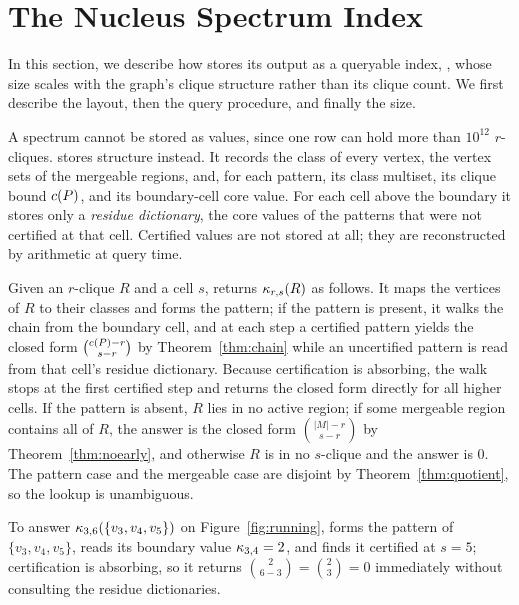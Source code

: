 \section{The Nucleus Spectrum Index}
\label{sec:index}

In this section, we describe how \specnd{} stores its output as a queryable index, \nsi, whose size scales with the graph's clique structure rather than its clique count.
%
We first describe the layout, then the query procedure, and finally the size.

A spectrum cannot be stored as values, since one row can hold more than $10^{12}$ $r$-cliques.
%
\nsi{} stores structure instead.
%
It records the class of every vertex, the vertex sets of the mergeable regions, and, for each pattern, its class multiset, its clique bound $c(P)$, and its boundary-cell core value.
%
For each cell above the boundary it stores only a \textit{residue dictionary}, the core values of the patterns that were not certified at that cell.
%
Certified values are not stored at all; they are reconstructed by arithmetic at query time.

Given an $r$-clique $R$ and a cell $s$, \nsi{} returns $\kappa_{r,s}(R)$ as follows.
%
It maps the vertices of $R$ to their classes and forms the pattern; if the pattern is present, it walks the chain from the boundary cell, and at each step a certified pattern yields the closed form $\binom{c(P)-r}{s-r}$ by Theorem~\ref{thm:chain} while an uncertified pattern is read from that cell's residue dictionary.
%
Because certification is absorbing, the walk stops at the first certified step and returns the closed form directly for all higher cells.
%
If the pattern is absent, $R$ lies in no active region; if some mergeable region contains all of $R$, the answer is the closed form $\binom{|M|-r}{s-r}$ by Theorem~\ref{thm:noearly}, and otherwise $R$ is in no $s$-clique and the answer is $0$.
%
The pattern case and the mergeable case are disjoint by Theorem~\ref{thm:quotient}, so the lookup is unambiguous.

\begin{example}
\label{exa:query}
To answer $\kappa_{3,6}(\{v_3,v_4,v_5\})$ on Figure~\ref{fig:running}, \nsi{} forms the pattern of $\{v_3,v_4,v_5\}$, reads its boundary value $\kappa_{3,4}=2$, and finds it certified at $s{=}5$; certification is absorbing, so it returns $\binom{2}{6-3}=\binom{2}{3}=0$ immediately without consulting the residue dictionaries.
\end{example}

